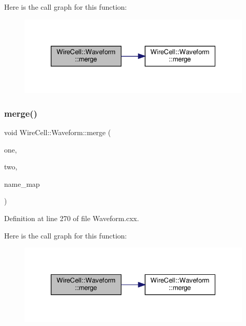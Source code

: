 Here is the call graph for this function\+:
\nopagebreak
\begin{figure}[H]
\begin{center}
\leavevmode
\includegraphics[width=326pt]{namespace_wire_cell_1_1_waveform_a49c3b64d64db947f08b1eedcf4c47772_cgraph}
\end{center}
\end{figure}
\mbox{\label{namespace_wire_cell_1_1_waveform_aaa9e0dfb1762dd280646e4b3c123d3ef}} 
\subsubsection{\texorpdfstring{merge()}{merge()}\hspace{0.1cm}{\footnotesize\ttfamily [4/4]}}
{\footnotesize\ttfamily void Wire\+Cell\+::\+Waveform\+::merge (\begin{DoxyParamCaption}\item[{\hyperlink{namespace_wire_cell_1_1_waveform_a18b9ae61c858e340252ba3ac83ac3bc0}{Channel\+Mask\+Map} \&}]{one,  }\item[{\hyperlink{namespace_wire_cell_1_1_waveform_a18b9ae61c858e340252ba3ac83ac3bc0}{Channel\+Mask\+Map} \&}]{two,  }\item[{std\+::map$<$ std\+::string, std\+::string $>$ \&}]{name\+\_\+map }\end{DoxyParamCaption})}



Definition at line 270 of file Waveform.\+cxx.

Here is the call graph for this function\+:
\nopagebreak
\begin{figure}[H]
\begin{center}
\leavevmode
\includegraphics[width=326pt]{namespace_wire_cell_1_1_waveform_aaa9e0dfb1762dd280646e4b3c123d3ef_cgraph}
\end{center}
\end{figure}
\mbox{\label{namespace_wire_cell_1_1_waveform_a86192f53532ba1e28516c2f8f3a9fa44}} 
